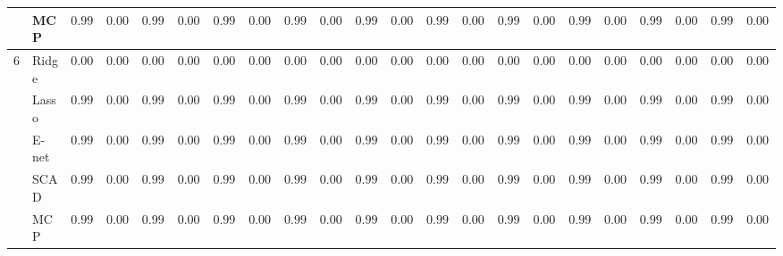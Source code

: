 \begin{tabular}{p{0.2cm}p{1cm}|p{0.6cm}p{0.6cm}|p{0.6cm}p{0.6cm}p{0.6cm}p{0.6cm}p{0.6cm}p{0.6cm}|p{0.6cm}p{0.6cm}p{0.6cm}p{0.6cm}p{0.6cm}p{0.6cm}|p{0.6cm}p{0.6cm}p{0.6cm}p{0.6cm}p{0.6cm}p{0.6cm}}
 & MCP  & $0.9984$ & $0.0011$ & $0.9980$ & $0.0013$ & $0.9986$ & $0.0009$ & $0.9990$ & $0.0004$ & $0.9982$ & $0.0014$ & $0.9985$ & $0.0013$ & $0.9984$ & $0.0014$ & $0.9984$ & $0.0013$ & $0.9985$ & $0.0010$ & $0.9986$ & $0.0012$ \\\hline
6 & Ridge  & $0.0000$ & $0.0000$ & $0.0000$ & $0.0000$ & $0.0000$ & $0.0000$ & $0.0000$ & $0.0000$ & $0.0000$ & $0.0000$ & $0.0000$ & $0.0000$ & $0.0000$ & $0.0000$ & $0.0000$ & $0.0000$ & $0.0000$ & $0.0000$ & $0.0000$ & $0.0000$ \\
 & Lasso  & $0.9994$ & $0.0006$ & $0.9994$ & $0.0005$ & $0.9990$ & $0.0015$ & $0.9989$ & $0.0012$ & $0.9995$ & $0.0001$ & $0.9993$ & $0.0016$ & $0.9993$ & $0.0010$ & $0.9995$ & $0.0002$ & $0.9991$ & $0.0017$ & $0.9991$ & $0.0007$ \\
 & E-net  & $0.9994$ & $0.0007$ & $0.9994$ & $0.0006$ & $0.9989$ & $0.0016$ & $0.9984$ & $0.0021$ & $0.9995$ & $0.0001$ & $0.9993$ & $0.0015$ & $0.9993$ & $0.0011$ & $0.9995$ & $0.0002$ & $0.9990$ & $0.0019$ & $0.9989$ & $0.0012$ \\
 & SCAD  & $0.9971$ & $0.0034$ & $0.9958$ & $0.0039$ & $0.9965$ & $0.0027$ & $0.9981$ & $0.0015$ & $0.9966$ & $0.0038$ & $0.9971$ & $0.0037$ & $0.9975$ & $0.0028$ & $0.9967$ & $0.0038$ & $0.9969$ & $0.0032$ & $0.9977$ & $0.0021$ \\
 & MCP  & $0.9988$ & $0.0011$ & $0.9985$ & $0.0014$ & $0.9989$ & $0.0008$ & $0.9991$ & $0.0004$ & $0.9987$ & $0.0014$ & $0.9989$ & $0.0010$ & $0.9989$ & $0.0010$ & $0.9988$ & $0.0013$ & $0.9989$ & $0.0009$ & $0.9987$ & $0.0014$ \\
\hline 
\end{tabular}

